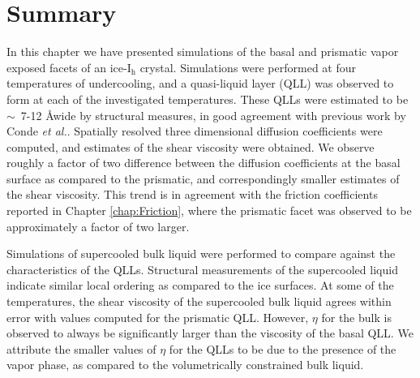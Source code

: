 

\section{Summary}
In this chapter we have presented simulations of the basal and
prismatic vapor exposed facets of an ice-I$_\mathrm{h}$
crystal. Simulations were performed at four temperatures of
undercooling, and a quasi-liquid layer (QLL) was observed to form at
each of the investigated temperatures. These QLLs were estimated to be
$\sim $~7-12 \AA wide by structural measures, in good agreement with
previous work by Conde \textit{et al.}.\cite{Conde2008} Spatially
resolved three dimensional diffusion coefficients were computed, and
estimates of the shear viscosity were obtained. We observe roughly a
factor of two difference between the diffusion coefficients at the
basal surface as compared to the prismatic, and correspondingly
smaller estimates of the shear viscosity. This trend is in agreement
with the friction coefficients reported in Chapter
\ref{chap:Friction}, where the prismatic facet was observed to be
approximately a factor of two larger.

Simulations of supercooled bulk liquid were performed to compare
against the characteristics of the QLLs. Structural measurements of
the supercooled liquid indicate similar local ordering as compared to
the ice surfaces. At some of the temperatures, the shear viscosity of
the supercooled bulk liquid agrees within error with values computed
for the prismatic QLL. However, $\eta$ for the bulk is observed to
always be significantly larger than the viscosity of the basal QLL. We
attribute the smaller values of $\eta$ for the QLLs to be due to the
presence of the vapor phase, as compared to the volumetrically
constrained bulk liquid. 